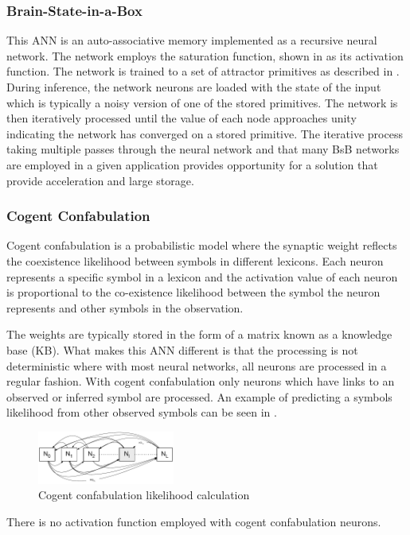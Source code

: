 \subsubsection*{Brain-State-in-a-Box}

This ANN is an auto-associative memory implemented as a recursive neural network. The network employs the saturation function, shown in  
as its activation function.
The network is trained to a set of attractor primitives as described in \cite{lillo1994synthesis}.
During inference, the network neurons are loaded with the state of the input which is typically a noisy version of one of the stored primitives.
The network is then iteratively processed until the value of each node approaches unity indicating the network has converged on a stored primitive.
The iterative process taking multiple passes through the neural network and that many BsB networks are employed in a given application
provides opportunity for a solution that provide acceleration and large storage.

\fi


\iffalse

\subsubsection*{Cogent Confabulation}

Cogent confabulation is a probabilistic model where the synaptic weight reflects the coexistence likelihood between symbols in different lexicons.
Each neuron represents a specific symbol in a lexicon and the activation value of each neuron is proportional to the co-existence likelihood between
the symbol the neuron represents and other symbols in the observation.

The weights are typically stored in the form of a matrix known as a knowledge base (KB).
What makes this ANN different is that the processing is not deterministic where with most neural networks, all neurons are processed in a regular fashion.
With cogent confabulation only neurons which have links to an observed or inferred symbol are processed.
An example of predicting a symbols likelihood from other observed symbols can be seen in .
\begin{figure}[hbtp]
\centering
\includegraphics[width=0.4\textwidth]{Chapter-1/figs/CCnetwork}
\captionsetup{justification=centering, skip=3pt}
\caption{Cogent confabulation likelihood calculation}
\label{fig:Cogent confabulation likelihood calculation}
\end{figure}
There is no activation function employed with cogent confabulation neurons.

